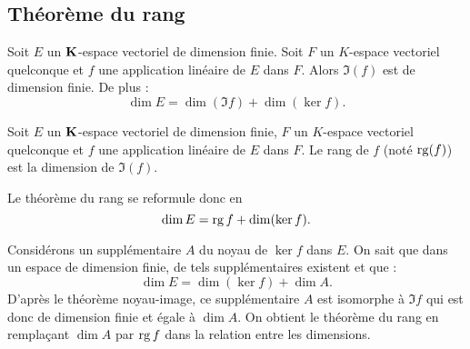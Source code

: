 \subsection{Théorème du rang}
\begin{thmn}
 Soit $E$ un $\mathbf{K}$-espace vectoriel de dimension finie. Soit $F$ un $K$-espace vectoriel quelconque et $f$ une application linéaire de $E$ dans $F$.  Alors $\Im(f)$ est de dimension finie. De plus :
\begin{displaymath}
 \dim E = \dim (\Im f) + \dim (\ker f).
\end{displaymath}
\end{thmn}
\begin{defi}
 Soit $E$ un $\mathbf{K}$-espace vectoriel de dimension finie, $F$ un $K$-espace vectoriel quelconque et $f$ une application linéaire de $E$ dans $F$. Le rang de $f$ (noté $\mathop{\mathrm{rg}} (f)$) est la dimension de $\Im(f)$.
\end{defi}
Le théorème du rang se reformule donc en
\begin{displaymath}
 \dim E = \mathop{\mathrm{rg}} f + \dim (\ker f).
\end{displaymath}
\begin{demo}
 Considérons un supplémentaire $A$ du noyau de $\ker f$ dans $E$. On sait que dans un espace de dimension finie, de tels supplémentaires existent et que :
\begin{displaymath}
 \dim E = \dim (\ker f) + \dim A.
\end{displaymath}
D'après le théorème noyau-image, ce supplémentaire $A$ est isomorphe à $\Im f$ qui est donc de dimension finie et égale à $\dim A$. On obtient le théorème du rang en remplaçant $\dim A$ par $\mathop{\mathrm{rg}} f$ dans la relation entre les dimensions.
\end{demo}

